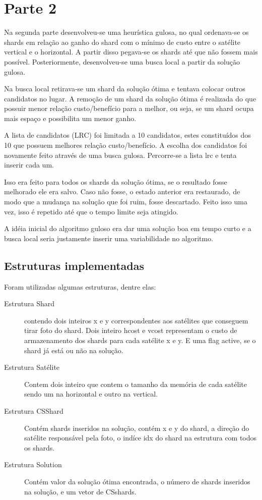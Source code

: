 \documentclass[11pt,letterpaper]{article}
\begin{document}
\section{Parte 2}

Na segunda parte desenvolveu-se uma heurística gulosa, no qual
ordenava-se os shards em relação ao ganho do shard com o mínimo de
custo entre o satélite vertical e o horizontal.
A partir disso pegava-se os shards até que não fossem mais possível.
Posteriormente, desenvolveu-se uma busca local a partir da solução
gulosa.

Na busca local retirava-se um shard da solução ótima e tentava colocar
outros candidatos no lugar. A remoção de um shard da solução ótima é realizada do que possuir
menor relação custo/benefício para a melhor, ou seja, se um shard
ocupa mais espaço e possibilita um menor ganho.

A lista de candidatos (LRC) foi limitada a 10 candidatos, estes
constituídos dos 10 que possuem melhores relação custo/benefício.
A escolha dos candidatos foi novamente feito através de uma busca
gulosa. Percorre-se a lista lrc e tenta inserir cada um.

Isso era feito para todos os shards da solução ótima, se o resultado
fosse melhorado ele era salvo. Caso não fosse, o estado anterior era
restaurado, de modo que a mudança na solução que foi ruim, fosse
descartado. Feito isso uma vez, isso é repetido até
que o tempo limite seja atingido.

A idéia inicial do algoritmo guloso era dar uma solução boa em tempo
curto e a busca local seria justamente inserir uma variabilidade no algoritmo.

\subsection{Estruturas implementadas}
Foram utilizadas algumas estruturas, dentre elas:
\begin{description}
\item[Estrutura Shard] contendo dois inteiros x e y correspondentes aos
satélites que conseguem tirar foto do shard. Dois inteiro hcost e
vcost representam o custo de armazenamento dos shards para cada
satélite x e y. E uma flag active, se o shard já está ou não na
solução.
\item[Estrutura Satélite] Contem dois inteiro que contem o tamanho da
  memória de cada satélite sendo um na horizontal e outro na vertical.
\item[Estrutura CSShard] Contém shards inseridos na solução, contém x
  e y do shard, a direção do satélite responsável pela foto, o indíce
  idx do shard na estrutura com todos os shards.
\item[Estrutura Solution] Contém valor da solução ótima encontrada, o
  número de shards inseridos na solução, e um vetor de CSshards.

\end{description}
\end{document}
